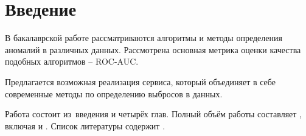 \chapter*{Введение}                         %

В бакалаврской работе рассматриваются алгоритмы и методы определения аномалий в различных данных. Рассмотрена основная метрика оценки качества подобных алгоритмов -- ROC-AUC. 

Предлагается возможная реализация сервиса, который объединяет в себе современные методы по определению выбросов в данных.


Работа состоит из~введения и четырёх глав.
Полный объём работы составляет
, включая
 и
.   Список литературы содержит
.
